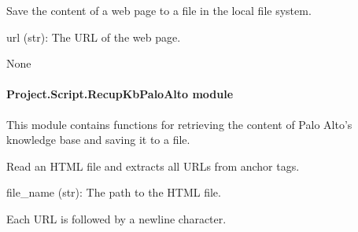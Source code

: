 \documentclass[letterpaper,10pt,english]{sphinxmanual}
\begin{document}
\begin{fulllineitems}
\label{\detokenize{Project.Script:Project.Script.RecupKbNETSKOPE.save_page_content}}
\pysigstartsignatures
{}
\pysigstopsignatures
\sphinxAtStartPar
Save the content of a web page to a file in the local file system.
\begin{description}
\sphinxAtStartPar
url (str): The URL of the web page.

\sphinxAtStartPar
None

\end{description}

\end{fulllineitems}



\paragraph{Project.Script.RecupKbPaloAlto module}
\label{\detokenize{Project.Script:module-Project.Script.RecupKbPaloAlto}}\label{\detokenize{Project.Script:project-script-recupkbpaloalto-module}}
\sphinxAtStartPar
This module contains functions for retrieving the content of Palo Alto’s knowledge base and saving it to a file.

\begin{fulllineitems}
\label{\detokenize{Project.Script:Project.Script.RecupKbPaloAlto.get_urls}}
\pysigstartsignatures
{}
\pysigstopsignatures
\sphinxAtStartPar
Read an HTML file and extracts all URLs from anchor tags.
\begin{description}
\sphinxAtStartPar
file\_name (str): The path to the HTML file.

\begin{description}
\sphinxAtStartPar
Each URL is followed by a newline character.

\end{description}

\end{description}

\end{fulllineitems}
\end{document}
